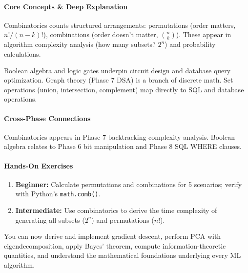 \documentclass[11pt, a4paper, oneside]{report}
\begin{document}
\paragraph{Core Concepts \& Deep Explanation} Combinatorics counts structured arrangements: permutations (order matters, $n!/(n-k)!$), combinations (order doesn't matter, $\binom{n}{k}$). These appear in algorithm complexity analysis (how many subsets? $2^n$) and probability calculations.

Boolean algebra and logic gates underpin circuit design and database query optimization. Graph theory (Phase 7 DSA) is a branch of discrete math. Set operations (union, intersection, complement) map directly to SQL and database operations.

\paragraph{Cross-Phase Connections} Combinatorics appears in Phase 7 backtracking complexity analysis. Boolean algebra relates to Phase 6 bit manipulation and Phase 8 SQL WHERE clauses.

\paragraph{Hands-On Exercises}
\begin{enumerate}[leftmargin=*]
\item \textbf{Beginner:} Calculate permutations and combinations for 5 scenarios; verify with Python's \texttt{math.comb()}.
\item \textbf{Intermediate:} Use combinatorics to derive the time complexity of generating all subsets ($2^n$) and permutations ($n!$).
\end{enumerate}

\begin{microcheckpoint}
You can now derive and implement gradient descent, perform PCA with eigendecomposition, apply Bayes' theorem, compute information-theoretic quantities, and understand the mathematical foundations underlying every ML algorithm.
\end{microcheckpoint}
\end{document}
